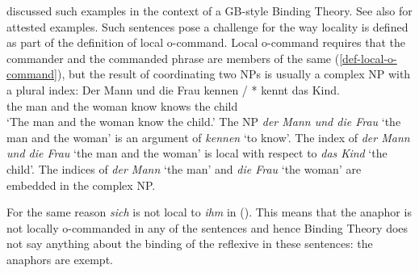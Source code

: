 \documentclass[output=paper
	        ,collection
	        ,collectionchapter
 	        ,biblatex
                ,babelshorthands
                ,newtxmath
                ,draftmode
                ,colorlinks, citecolor=brown
]{langscibook}
\begin{document}
\citet[]{Fanselow87a} discussed such examples in the context of a GB-style Binding
Theory. See also  for attested examples.
Such sentences pose a challenge for the way locality is defined as part of the definition of local
o-command. Local o-command requires that the commander and the commanded phrase are members of the
same \argstl (\ref{def-local-o-command}), but the result of coordinating two NPs is usually a complex NP with a plural index:
\ea
\gll Der Mann und die Frau kennen / * kennt das Kind.\\
     the man  and the woman know {} {} knows the child\\
\glt `The man and the woman know the child.'
\z
The NP \emph{der Mann und die Frau} `the man and the woman' is an argument of \emph{kennen} `to know'. The index of
\emph{der Mann und die Frau} `the man and the woman' is local with respect to \emph{das Kind} `the child'. The indices of
\emph{der Mann} `the man' and \emph{die Frau} `the woman' are embedded in the complex NP.

For the same reason \emph{sich} is not local to \emph{ihm} in (). This means that the anaphor is not locally o-commanded in any
of the sentences and hence Binding Theory does not say anything about the binding of the reflexive
in these sentences: the anaphors are exempt.
\end{document}
